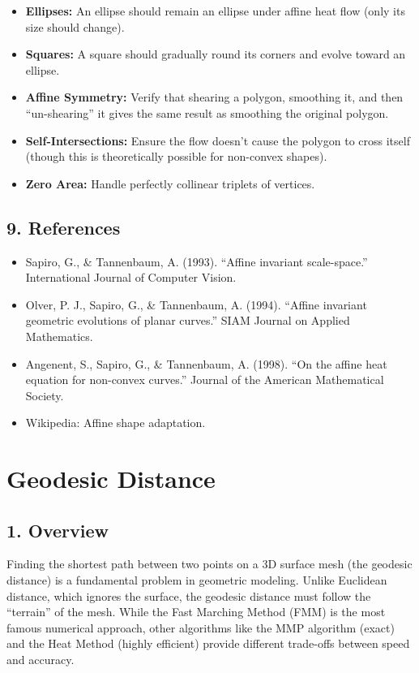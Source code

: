 \begin{itemize}
    \item \textbf{Ellipses:} An ellipse should remain an ellipse under affine heat flow (only its size should change).
    \item \textbf{Squares:} A square should gradually round its corners and evolve toward an ellipse.
    \item \textbf{Affine Symmetry:} Verify that shearing a polygon, smoothing it, and then ``un-shearing'' it gives the same result as smoothing the original polygon.
    \item \textbf{Self-Intersections:} Ensure the flow doesn't cause the polygon to cross itself (though this is theoretically possible for non-convex shapes).
    \item \textbf{Zero Area:} Handle perfectly collinear triplets of vertices.
\end{itemize}

\subsection{9. References}

\begin{itemize}
    \item Sapiro, G., \& Tannenbaum, A. (1993). ``Affine invariant scale-space.'' International Journal of Computer Vision.
    \item Olver, P. J., Sapiro, G., \& Tannenbaum, A. (1994). ``Affine invariant geometric evolutions of planar curves.'' SIAM Journal on Applied Mathematics.
    \item Angenent, S., Sapiro, G., \& Tannenbaum, A. (1998). ``On the affine heat equation for non-convex curves.'' Journal of the American Mathematical Society.
    \item Wikipedia: Affine shape adaptation.
\end{itemize}

\section{Geodesic Distance}
\label{sec:geodesic_distance}

\subsection{1. Overview}

Finding the shortest path between two points on a 3D surface mesh (the geodesic distance) is a fundamental problem in geometric modeling\cite{mitchell1987,crane2013geodesic,sethian1996}. Unlike Euclidean distance, which ignores the surface, the geodesic distance must follow the ``terrain'' of the mesh. While the Fast Marching Method (FMM) is the most famous numerical approach, other algorithms like the MMP algorithm (exact) and the Heat Method (highly efficient) provide different trade-offs between speed and accuracy.


